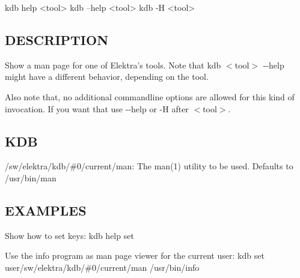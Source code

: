 \begin{DoxyVerb}    kdb help <tool>
    kdb --help <tool>
    kdb -H <tool>
\end{DoxyVerb}


\subsection*{D\+E\+S\+C\+R\+I\+P\+T\+I\+ON}

Show a man page for one of Elektra’s tools. Note that {\ttfamily kdb $<$tool$>$ -\/-\/help} might have a different behavior, depending on the tool.

Also note that, no additional commandline options are allowed for this kind of invocation. If you want that use {\ttfamily -\/-\/help} or {\ttfamily -\/H} after {\ttfamily $<$tool$>$}.

\subsection*{K\+DB}


\begin{DoxyItemize}
\item {\ttfamily /sw/elektra/kdb/\#0/current/man}\+: The man(1) utility to be used. Defaults to /usr/bin/man
\end{DoxyItemize}

\subsection*{E\+X\+A\+M\+P\+L\+ES}

Show how to set keys\+: {\ttfamily kdb help set}

Use the info program as man page viewer for the current user\+: {\ttfamily kdb set user/sw/elektra/kdb/\#0/current/man /usr/bin/info} 